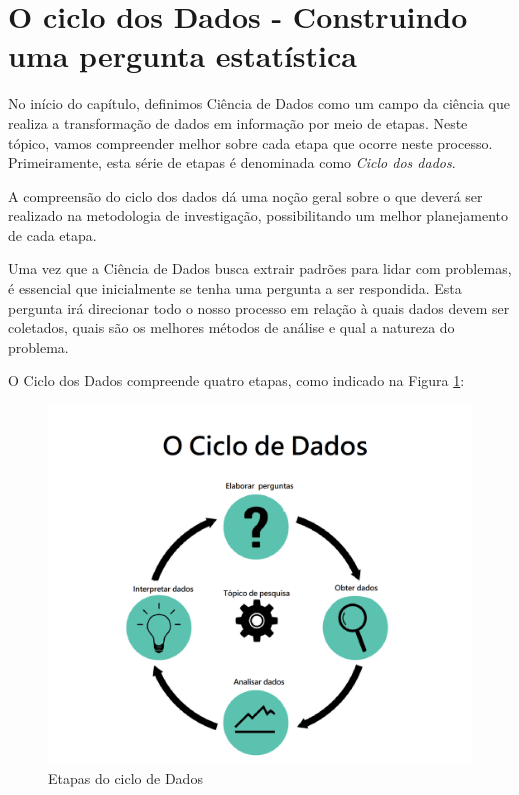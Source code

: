 \documentclass[
  portuguese,
  oneside]{book}
\begin{document}
\hypertarget{o-ciclo-dos-dados---construindo-uma-pergunta-estatuxedstica}{%
\section{O ciclo dos Dados - Construindo uma pergunta estatística}\label{o-ciclo-dos-dados---construindo-uma-pergunta-estatuxedstica}}

No início do capítulo, definimos Ciência de Dados como um campo da ciência que realiza a transformação de dados em informação por meio de etapas. Neste tópico, vamos compreender melhor sobre cada etapa que ocorre neste processo. Primeiramente, esta série de etapas é denominada como \emph{Ciclo dos dados}.

A compreensão do ciclo dos dados dá uma noção geral sobre o que deverá ser realizado na metodologia de investigação, possibilitando um melhor planejamento de cada etapa.

Uma vez que a Ciência de Dados busca extrair padrões para lidar com problemas, é essencial que inicialmente se tenha uma pergunta a ser respondida. Esta pergunta irá direcionar todo o nosso processo em relação à quais dados devem ser coletados, quais são os melhores métodos de análise e qual a natureza do problema.

O Ciclo dos Dados compreende quatro etapas, como indicado na Figura \ref{fig:figura5}:

\begin{figure}

{\centering \includegraphics[width=0.8\linewidth]{fig_cap1/cap1_fig1} 

}

\caption{Etapas do ciclo de Dados}\label{fig:figura5}
\end{figure}
\end{document}
